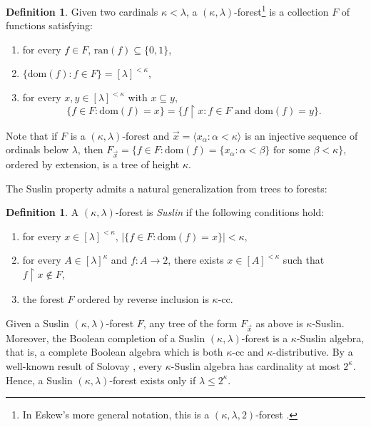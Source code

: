 \documentclass[]{amsart}
\theoremstyle{definition}
\newtheorem{definition}[theorem]{Definition}
\theoremstyle{remark}
\begin{document}
\begin{definition}
Given two cardinals $\kappa < \lambda$, a $(\kappa, \lambda)$-forest\footnote{In Eskew's more general notation, this is a $(\kappa, \lambda, 2)$-forest \cite{MR3326048}.} is a collection $F$ of functions satisfying:
\begin{enumerate}
\item for every $f \in F$, $\mathrm{ran}(f) \subseteq \{0,1\}$,
\item $\{\mathrm{dom}(f) : f \in F\} = [\lambda]^{< \kappa}$,
\item for every $x,y \in [\lambda]^{< \kappa}$ with $x \subseteq y$,
\[
\{f \in F : \mathrm{dom}(f) = x\} = \{f \upharpoonright x : f \in F \text{ and } \mathrm{dom}(f) = y\}.
\]
\end{enumerate}
\end{definition}
Note that if $F$ is a $(\kappa, \lambda)$-forest and $\vec{x} = \langle x_\alpha : \alpha < \kappa\rangle$ is an injective sequence of ordinals below $\lambda$, then  $F_{\vec{x}} = \{f \in F : \mathrm{dom}(f) = \{x_\alpha : \alpha < \beta\} \text{ for some } \beta < \kappa\}$, ordered by extension, is a tree of height $\kappa$. 

The Suslin property admits a natural generalization from trees to forests:

\begin{definition}
A $(\kappa, \lambda)$-forest is \emph{Suslin} if the following conditions hold:
\begin{enumerate}
\item for every $x \in [\lambda]^{< \kappa}$, $|\{f \in F : \mathrm{dom}(f) = x\}| < \kappa$,
\item for every $A \in [\lambda]^\kappa$ and $f : A \rightarrow 2$, there exists $x \in [A]^{< \kappa}$ such that $f \upharpoonright x \not\in F$,
\item the forest $F$ ordered by reverse inclusion is $\kappa$-cc.
\end{enumerate}
\end{definition}

Given a Suslin $(\kappa, \lambda)$-forest $F$, any tree of the form $F_{\vec{x}}$ as above is $\kappa$-Suslin. Moreover, the Boolean completion of a Suslin $(\kappa, \lambda)$-forest is a $\kappa$-Suslin algebra, that is, a complete Boolean algebra which is both $\kappa$-cc and $\kappa$-distributive. By a well-known result of Solovay \cite[Theorem 30.20]{MR1940513}, every $\kappa$-Suslin algebra has cardinality at most $2^\kappa$. Hence, a Suslin $(\kappa, \lambda)$-forest exists only if $\lambda \le 2^\kappa$.  
\end{document}
